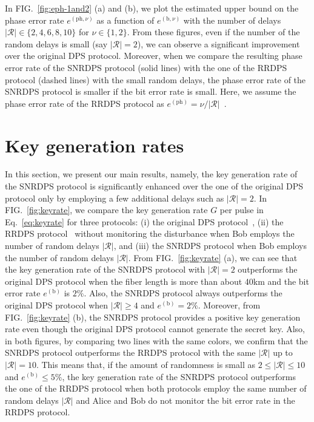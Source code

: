 \documentclass[twocolumn,superscriptaddress,pra,footinbib,notitlepage]{revtex4-1}
\newcommand{\1}{\mbox{1}\hspace{-0.25em}\mbox{l}}
\newcommand{\abs}[1]{\lvert#1\rvert}
\begin{document}
In FIG.~\ref{fig:eph-1and2} (a) and (b), we plot the estimated upper bound on the phase error rate $e^{(\textrm{ph}, \nu)}$ as a function of $e^{(\textrm{b}, \nu)}$ with the number of delays $\abs{\mathcal{R}}\in\{2,4,6,8,10\}$ for $\nu\in\{1, 2\}$. 
From these figures, even if the number of the random delays is small (say $\abs{\mathcal{R}}=2$), we can observe a significant improvement over the original DPS protocol.
Moreover, when we compare the resulting phase error rate of the SNRDPS  protocol (solid lines) with the one of the RRDPS protocol (dashed lines) with the small random delays, the phase error rate of the SNRDPS protocol is smaller if the bit error rate is small. Here, we assume the phase error rate of the RRDPS protocol as $e^{(\textrm{ph})}=\nu/\abs{\mathcal{R}}$~\cite{sasaki2014practical}.

\section{Key generation rates}
\label{sec:key-generation-rates}
In this section, we present our main results, namely, the key generation rate of the SNRDPS protocol is significantly enhanced over the one of the original DPS protocol only by employing a few additional delays such as $\abs{\mathcal{R}}=2$.
In FIG.~\ref{fig:keyrate}, we compare the key generation rate $G$ per pulse in Eq.~\eqref{eq:keyrate} for three protocols:
(i) the original DPS protocol~\cite{tamaki2012unconditional}, 
(ii) the RRDPS protocol~\cite{sasaki2014practical} without monitoring the disturbance when Bob employs the number of random delays $\abs{\mathcal{R}}$, 
and (iii) the SNRDPS protocol when Bob employs the number of random delays $\abs{\mathcal{R}}$.
From FIG.~\ref{fig:keyrate} (a), we can see that the key generation rate of the SNRDPS protocol with $\abs{\mathcal{R}}=2$ outperforms the original DPS protocol when the fiber length is more than about 40km and the bit error rate $e^{(\textrm{b})}$ is $2\%$.
Also, the SNRDPS protocol always outperforms the original DPS protocol when $\abs{\mathcal{R}}\geq4$ and $e^{(\textrm{b})}=2\%$.
Moreover, from FIG.~\ref{fig:keyrate} (b), the SNRDPS protocol provides a positive key generation rate even though the original DPS protocol cannot generate the secret key.
Also, in both figures, by comparing two lines with the same colors, we confirm that the SNRDPS protocol outperforms the RRDPS protocol with the same $\abs{\mathcal{R}}$ up to $\abs{\mathcal{R}}=10$.
This means that, if the amount of randomness is small as $2\leq\abs{\mathcal{R}}\leq 10$ and $e^{(\textrm{b})}\leq 5\%$, the key generation rate of the SNRDPS protocol outperforms the one of the RRDPS protocol when both protocols employ the same number of random delays $\abs{\mathcal{R}}$ and Alice and Bob do not monitor the bit error rate in the RRDPS protocol.
\end{document}
